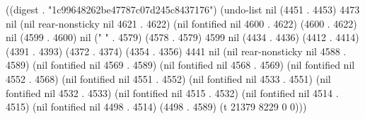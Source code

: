 
((digest . "1c99648262be47787c07d245c8437176") (undo-list nil (4451 . 4453) 4473 nil (nil rear-nonsticky nil 4621 . 4622) (nil fontified nil 4600 . 4622) (4600 . 4622) nil (4599 . 4600) nil (" " . 4579) (4578 . 4579) 4599 nil (4434 . 4436) (4412 . 4414) (4391 . 4393) (4372 . 4374) (4354 . 4356) 4441 nil (nil rear-nonsticky nil 4588 . 4589) (nil fontified nil 4569 . 4589) (nil fontified nil 4568 . 4569) (nil fontified nil 4552 . 4568) (nil fontified nil 4551 . 4552) (nil fontified nil 4533 . 4551) (nil fontified nil 4532 . 4533) (nil fontified nil 4515 . 4532) (nil fontified nil 4514 . 4515) (nil fontified nil 4498 . 4514) (4498 . 4589) (t 21379 8229 0 0)))
